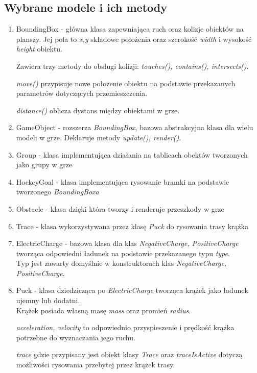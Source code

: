 \documentclass{article}
\begin{document}
\clearpage
\subsection{Wybrane modele i ich metody}
\begin{enumerate}
    \item BoundingBox - główna klasa zapewniająca ruch oraz kolizje obiektów na planszy.
    Jej pola to \textit{x,y} składowe położenia oraz szerokość \textit{width} i wysokość \textit{height} obiektu.
    
    Zawiera trzy metody do obsługi kolizji: \textit{touches(), contains(), intersects()}.
    
    \textit{move()} przypisuje nowe położenie obiektu na podstawie przekazanych parametrów dotyczących przemieszczenia.
    
    \textit{distance()} oblicza dystans między obiektami w grze.
    
    \item GameObject - rozszerza \emph{BoundingBox}, bazowa abstrakcyjna klasa dla wielu modeli w grze. Deklaruje metody \textit{update(), render()}.
    \item Group - klasa implementująca działania na tablicach obektów tworzonych jako grupy w grze
    \item HockeyGoal - klasa implementująca rysowanie bramki na podstawie tworzonego \emph{BoundingBoxa}
    \item Obstacle - klasa dzięki która tworzy i renderuje przeszkody w grze
    \item Trace - klasa wykorzystywana przez klasę \textit{Puck} do rysowania trasy krążka
    \item ElectricCharge - bazowa klasa dla klas \textit{NegativeCharge, PositiveCharge} tworząca odpowiedni ładunek na podstawie przekazanego typu \emph{type}.\\
    Typ jest zawarty domyślnie w konstruktorach klas \textit{NegativeCharge, PositiveCharge}.
    \item Puck - klasa dziedzicząca po \emph{ElectricCharge} tworząca krążek jako ładunek ujemny lub dodatni.\\
    Krążek posiada własną masę \emph{mass} oraz promień \emph{radius}.
    
    \emph{acceleration, velocity} to odpowiednio przyspieszenie i prędkość krążka potrzebne do wyznaczania jego ruchu.
    
    \emph{trace} gdzie przypisany jest obiekt klasy \emph{Trace}  oraz \emph{traceIsActive} dotyczą możliwości rysowania przebytej przez krążek trasy.
    

\end{enumerate}
\end{document}
